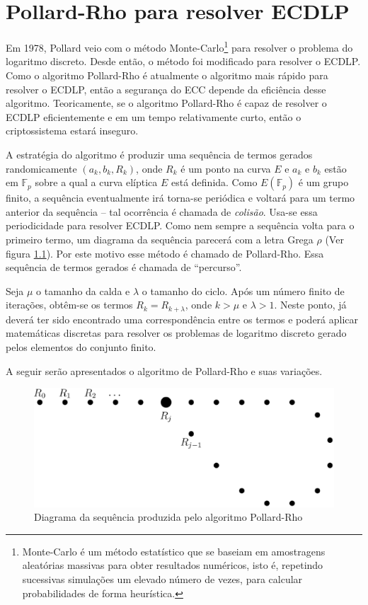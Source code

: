 \chapter{Pollard-Rho para resolver ECDLP}
Em 1978, Pollard veio com o método Monte-Carlo\footnote{Monte-Carlo é um método estatístico que se baseiam em amostragens aleatórias massivas para obter resultados numéricos, isto é, repetindo sucessivas simulações um elevado número de vezes, para calcular probabilidades de forma heurística.} para resolver o problema do logaritmo discreto. Desde então, o método foi modificado para resolver o ECDLP. Como o algoritmo Pollard-Rho é atualmente o algoritmo mais rápido para resolver o ECDLP, então a segurança do ECC depende da eficiência desse algoritmo. Teoricamente, se o algoritmo Pollard-Rho é capaz de resolver o ECDLP eficientemente e em um tempo relativamente curto, então o criptossistema estará inseguro. \cite{Mandy:2007}

A estratégia do algoritmo é produzir uma sequência de termos gerados randomicamente $(a_k, b_k, R_k)$, onde \(R_k\) é um ponto na curva \(E\) e \(a_k\)  e \(b_k\) estão em $\mathbb{F}_p$ sobre a qual a curva elíptica \(E\) está definida. Como $E(\mathbb{F}_p)$ é um grupo finito, a sequência eventualmente irá torna-se periódica e voltará para um termo anterior da sequência \--- tal ocorrência é chamada de \textit{colisão}. Usa-se essa periodicidade para resolver ECDLP. Como nem sempre a sequência volta para o primeiro termo, um diagrama da sequência parecerá com a letra Grega \(\rho\) (Ver figura \ref{fig:rho}). Por este motivo esse método é chamado de Pollard-Rho. Essa sequência de termos gerados é chamada de ``percurso''.

Seja \(\mu\) o tamanho da calda e \(\lambda\) o tamanho do ciclo. Após um número finito de iterações, obtêm-se os termos $R_k = R_{k+\lambda}$, onde $k > \mu$ e $\lambda > 1$. Neste ponto, já deverá ter sido encontrado uma correspondência entre os termos e poderá aplicar matemáticas discretas para resolver os problemas de logaritmo discreto gerado pelos elementos do conjunto finito.

A seguir serão apresentados o algoritmo de Pollard-Rho e suas variações.

\begin{figure}[h]
\centering
\includegraphics[scale=0.4, bb=0 0 888 376]{figuras/rho.eps}
\caption{Diagrama da sequência produzida pelo algoritmo Pollard-Rho}
\label{fig:rho}
\end{figure}

